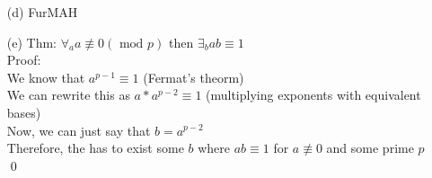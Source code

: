 \documentclass[11pt]{article}
\theoremstyle{definition}
\begin{document}
\begin{enumerate}
	\item[(d)] FurMAH

	\item[(e)]
	Thm: $\forall_a a \not\equiv 0 (\text{ mod } p)$ then $\exists_b ab \equiv 1$\\
	Proof:\\
	We know that $a^{p-1} \equiv 1$ (Fermat's theorm)\\
	We can rewrite this as $a * a^{p-2} \equiv 1$ (multiplying exponents with equivalent bases)\\
	Now, we can just say that $b = a^{p-2}$\\
	Therefore, the has to exist some $b$ where $ab \equiv 1$ for $a \not\equiv 0$ and some prime $p$\\
	\qed

\end{enumerate}
\end{document}

